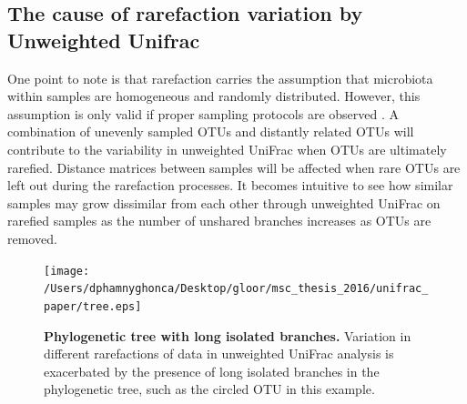 \documentclass[10pt,letterpaper]{article}
\begin{document}
\FloatBarrier

\subsection{The cause of rarefaction variation by Unweighted Unifrac}
One point to note is that rarefaction carries the assumption that microbiota within samples are homogeneous and randomly distributed. However, this assumption is only valid if proper sampling protocols are observed \cite{gorzelak2015methods}. A combination of unevenly sampled OTUs and distantly related OTUs will contribute to the variability in unweighted UniFrac when OTUs are ultimately rarefied. Distance matrices between samples will be affected when rare OTUs are left out during the rarefaction processes. It becomes intuitive to see how similar samples may grow dissimilar from each other through unweighted UniFrac on rarefied samples as the number of unshared branches increases as OTUs are removed.

\begin{figure}[h]
\texttt{[image: /Users/dphamnyghonca/Desktop/gloor/msc\_thesis\_2016/unifrac\_paper/tree.eps]}
\caption{{\bf Phylogenetic tree with long isolated branches.}
Variation in different rarefactions of data in unweighted UniFrac analysis is exacerbated by the presence of long isolated branches in the phylogenetic tree, such as the circled OTU in this example.}
\label{fig4}
\end{figure}
\end{document}
